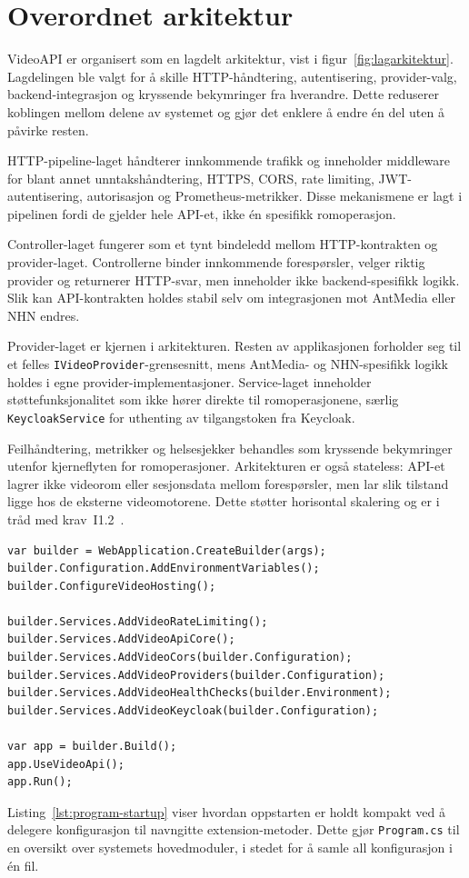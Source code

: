 \section{Overordnet arkitektur}
\label{sec:arkitektur}

VideoAPI er organisert som en lagdelt arkitektur, vist i
figur~\ref{fig:lagarkitektur}. Lagdelingen ble valgt for å skille
HTTP-håndtering, autentisering, provider-valg, backend-integrasjon og kryssende
bekymringer fra hverandre. Dette reduserer koblingen mellom delene av systemet
og gjør det enklere å endre én del uten å påvirke resten.



HTTP-pipeline-laget håndterer innkommende trafikk og inneholder middleware for
blant annet unntakshåndtering, HTTPS, CORS, rate limiting, JWT-autentisering,
autorisasjon og Prometheus-metrikker. Disse mekanismene er lagt i pipelinen
fordi de gjelder hele API-et, ikke én spesifikk romoperasjon.

Controller-laget fungerer som et tynt bindeledd mellom HTTP-kontrakten og
provider-laget. Controllerne binder innkommende forespørsler, velger riktig
provider og returnerer HTTP-svar, men inneholder ikke backend-spesifikk logikk.
Slik kan API-kontrakten holdes stabil selv om integrasjonen mot AntMedia eller
NHN endres.

Provider-laget er kjernen i arkitekturen. Resten av applikasjonen forholder seg
til et felles \texttt{IVideoProvider}-grensesnitt, mens AntMedia- og
NHN-spesifikk logikk holdes i egne provider-implementasjoner. Service-laget
inneholder støttefunksjonalitet som ikke hører direkte til romoperasjonene, særlig
\texttt{KeycloakService} for uthenting av tilgangstoken fra Keycloak.

Feilhåndtering, metrikker og helsesjekker behandles som kryssende bekymringer
utenfor kjerneflyten for romoperasjoner. Arkitekturen er også stateless: API-et
lagrer ikke videorom eller sesjonsdata mellom forespørsler, men lar slik
tilstand ligge hos de eksterne videomotorene. Dette støtter horisontal skalering
og er i tråd med krav~I1.2~\cite{hdo_kravspec}.

\begin{lstlisting}[language=CSharp, caption={oppstartskonfigurasjon i \texttt{Program.cs}}, label={lst:program-startup}]
var builder = WebApplication.CreateBuilder(args);
builder.Configuration.AddEnvironmentVariables();
builder.ConfigureVideoHosting();

builder.Services.AddVideoRateLimiting();
builder.Services.AddVideoApiCore();
builder.Services.AddVideoCors(builder.Configuration);
builder.Services.AddVideoProviders(builder.Configuration);
builder.Services.AddVideoHealthChecks(builder.Environment);
builder.Services.AddVideoKeycloak(builder.Configuration);

var app = builder.Build();
app.UseVideoApi();
app.Run();
\end{lstlisting}
Listing~\ref{lst:program-startup} viser hvordan oppstarten er holdt kompakt ved
å delegere konfigurasjon til navngitte extension-metoder. Dette gjør
\texttt{Program.cs} til en oversikt over systemets hovedmoduler, i stedet for å
samle all konfigurasjon i én fil.